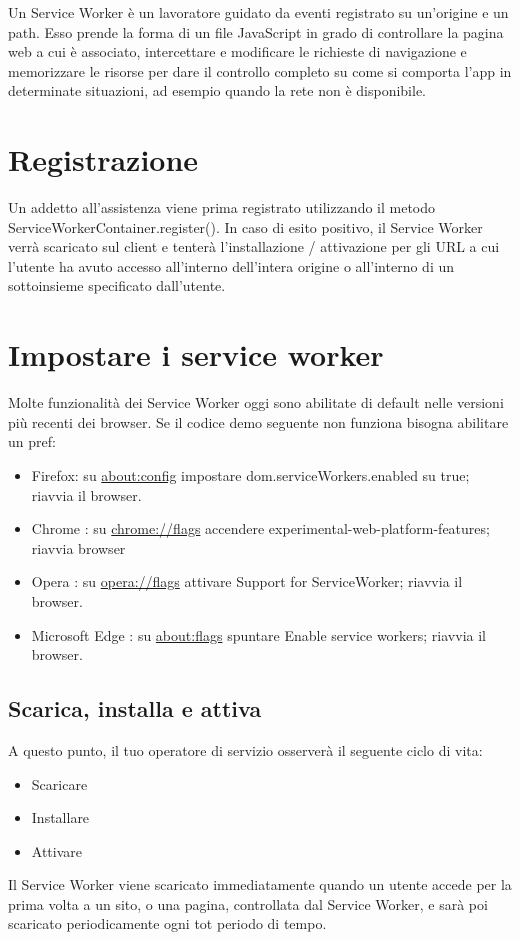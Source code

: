 \documentclass[italian]{article}
\begin{document}
Un Service Worker è un lavoratore guidato da eventi registrato su un'origine e un path. Esso prende la forma di un file JavaScript in grado di controllare la pagina web a cui è associato, intercettare e modificare le richieste di navigazione e memorizzare le risorse per dare il controllo completo su come si comporta l'app in determinate situazioni, ad esempio quando la rete non è disponibile.

\section{Registrazione}
Un addetto all'assistenza viene prima registrato utilizzando il metodo ServiceWorkerContainer.register(). In caso di esito positivo, il Service Worker verrà scaricato sul client e tenterà l'installazione / attivazione per gli URL a cui l'utente ha avuto accesso all'interno dell'intera origine o all'interno di un sottoinsieme specificato dall'utente.

\section{Impostare i service worker}
Molte funzionalità dei Service Worker oggi sono abilitate di default nelle versioni più recenti dei browser. Se il codice demo seguente non funziona bisogna abilitare un pref:
\begin{itemize}
\item Firefox: su \url{about:config} impostare dom.serviceWorkers.enabled su true; riavvia il browser.
\item Chrome : su \url{chrome://flags} accendere  experimental-web-platform-features; riavvia browser
\item Opera : su \url{opera://flags} attivare Support for ServiceWorker; riavvia il browser.
\item Microsoft Edge : su \url{about:flags} spuntare  Enable service workers; riavvia il browser.
\end{itemize}

\subsection{Scarica, installa e attiva}
A questo punto, il tuo operatore di servizio osserverà il seguente ciclo di vita:
\begin{itemize}
\item Scaricare
\item Installare
\item Attivare
\end{itemize}
Il Service Worker viene scaricato immediatamente quando un utente accede per la prima volta a un sito, o una pagina, controllata dal Service Worker, e sarà poi scaricato periodicamente ogni tot periodo di tempo.
\end{document}
